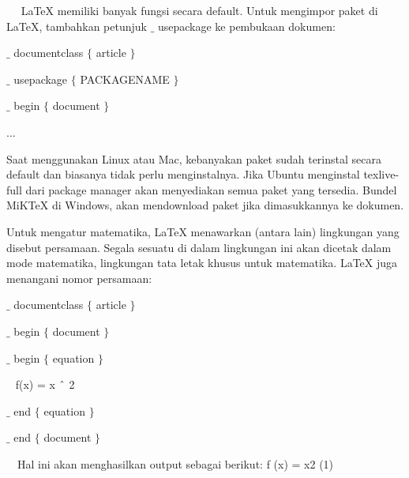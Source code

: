 ~~ LaTeX memiliki banyak fungsi secara default. Untuk mengimpor paket di LaTeX, tambahkan petunjuk  $ \_ $  usepackage ke pembukaan dokumen:\par

\noindent  $ \_ $ documentclass $ \{ $ article $ \} $ \par
\noindent 

\vspace{12pt}
\noindent  $ \_ $ usepackage $ \{ $ PACKAGENAME $ \} $ \par
\noindent 

\vspace{12pt}
\noindent  $ \_ $ begin $ \{ $ document $ \} $ \par

\noindent ...\par
\vspace{12pt}
Saat menggunakan Linux atau Mac, kebanyakan paket sudah terinstal secara default dan biasanya tidak perlu menginstalnya. Jika Ubuntu menginstal texlive-full dari package manager akan menyediakan semua paket yang tersedia. Bundel MiKTeX di Windows, akan mendownload paket jika dimasukkannya ke dokumen.\par

Untuk mengatur matematika, LaTeX menawarkan (antara lain) lingkungan yang disebut persamaan. Segala sesuatu di dalam lingkungan ini akan dicetak dalam mode matematika, lingkungan tata letak khusus untuk matematika. LaTeX juga menangani nomor persamaan:\par

{\fontsize{10pt}{10pt}\selectfont  $ \_ $ documentclass $ \{ $ article $ \} $ }\par

{\fontsize{10pt}{10pt}\selectfont  $ \_ $ begin $ \{ $ document $ \} $ }\par

{\fontsize{10pt}{10pt}\selectfont  $ \_ $ begin $ \{ $ equation $ \} $ }\par

{\fontsize{10pt}{10pt}\selectfont ~ f(x) = x $ \string^ $ 2}\par

{\fontsize{10pt}{10pt}\selectfont  $ \_ $ end $ \{ $ equation $ \} $ }\par

{\fontsize{10pt}{10pt}\selectfont  $ \_ $ end $ \{ $ document $ \} $ }\par
~~\noindent Hal ini akan menghasilkan output sebagai berikut: f (x) = x2 (1)\par

